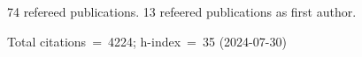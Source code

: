 74 refereed publications. 13 refeered publications as first author.

Total citations~=~4224; h-index~=~35 (2024-07-30)